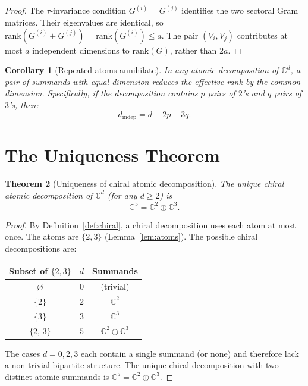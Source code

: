 \documentclass[12pt]{amsart}
\newtheorem{theorem}{Theorem}[section]
\newtheorem{corollary}[theorem]{Corollary}
\theoremstyle{definition}
\theoremstyle{remark}
\newcommand{\CC}{\mathbb{C}}
\begin{document}
\begin{proof}
The $\tau$-invariance condition
$G^{(i)} = G^{(j)}$ identifies the two
sectoral Gram matrices.
Their eigenvalues are identical, so
$\mathrm{rank}(G^{(i)} + G^{(j)})
= \mathrm{rank}(G^{(i)}) \le a$.
The pair $(V_i, V_j)$ contributes
at most $a$ independent dimensions to
$\mathrm{rank}(G)$, rather than $2a$.
\end{proof}

\begin{corollary}[Repeated atoms annihilate]
\label{cor:annihilate}
In any atomic decomposition of $\CC^d$,
a pair of summands with equal dimension
reduces the effective rank by
the common dimension.
Specifically, if the decomposition contains
$p$ pairs of $2$'s and $q$ pairs of $3$'s,
then:
\begin{equation}
d_{\mathrm{indep}}
= d - 2p - 3q.
\end{equation}
\end{corollary}

\section{The Uniqueness Theorem}
\label{sec:uniqueness}

\begin{theorem}[Uniqueness of chiral atomic decomposition]
\label{thm:main}
The unique chiral atomic decomposition of
$\CC^d$ (for any $d \ge 2$) is
\begin{equation}
\CC^5 = \CC^2 \oplus \CC^3.
\end{equation}
\end{theorem}

\begin{proof}
By Definition~\ref{def:chiral},
a chiral decomposition uses each atom
at most once.
The atoms are $\{2, 3\}$
(Lemma~\ref{lem:atoms}).
The possible chiral decompositions are:

\medskip
\begin{center}
\begin{tabular}{ccc}
\toprule
Subset of $\{2,3\}$ & $d$ & Summands \\
\midrule
$\varnothing$ & $0$ & (trivial) \\
$\{2\}$ & $2$ & $\CC^2$ \\
$\{3\}$ & $3$ & $\CC^3$ \\
$\{2,\, 3\}$ & $5$ & $\CC^2 \oplus \CC^3$ \\
\bottomrule
\end{tabular}
\end{center}

\medskip
The cases $d = 0, 2, 3$ each contain a
single summand (or none) and therefore
lack a non-trivial bipartite structure.
The unique chiral decomposition with
two distinct atomic summands is
$\CC^5 = \CC^2 \oplus \CC^3$.
\end{proof}
\end{document}
